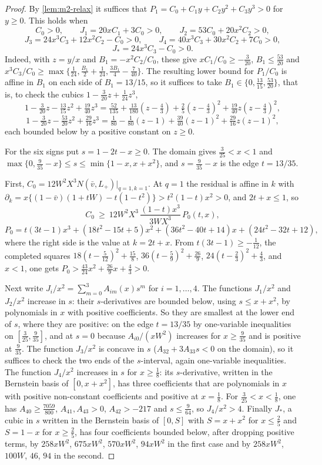 \begin{proof}
By \cref{lem:m2-relax} it suffices that $P_1=C_0+C_1y+C_2y^2+C_3y^3>0$ for $y\ge0$. This holds when
\[
C_0>0,\qquad J_1=20xC_1+3C_0>0,\qquad J_2=53C_0+20x^2C_2>0,
\]
\[
J_3=24x^3C_3+12x^2C_2-C_0>0,\qquad J_4=40x^3C_3+30x^2C_2+7C_0>0,
\]
\[
J_*=24x^3C_3-C_0>0.
\]
Indeed, with $z=y/x$ and $B_1=-x^2C_2/C_0$, these give $xC_1/C_0\ge-\frac3{20}$, $B_1\le\frac{53}{20}$
and $x^3C_3/C_0\ge\max\{\frac1{24},\frac{B_1}2+\frac1{24},\frac{3B_1}4-\frac7{40}\}$. The resulting lower
bound for $P_1/C_0$ is affine in $B_1$ on each side of $B_1=13/15$, so it suffices to take
$B_1\in\{0,\frac{13}{15},\frac{53}{20}\}$, that is, to check the cubics $1-\frac3{20}z+\frac1{24}z^3$,
\[
1-\tfrac3{20}z-\tfrac{13}{15}z^2+\tfrac{19}{40}z^3=\tfrac{52}{135}+\tfrac{13}{180}(z-\tfrac43)+\tfrac25(z-\tfrac43)^2+\tfrac{19}{40}z(z-\tfrac43)^2,
\]
\[
1-\tfrac3{20}z-\tfrac{53}{20}z^2+\tfrac{29}{16}z^3=\tfrac1{80}-\tfrac1{80}(z-1)+\tfrac{39}{40}(z-1)^2+\tfrac{29}{16}z(z-1)^2,
\]
each bounded below by a positive constant on $z\ge0$.

For the six signs put $s=1-2t-x\ge0$. The domain gives $\frac3{25}<x<1$ and
$\max\{0,\frac9{35}-x\}\le s\le\min\{1-x,x+x^2\}$, and $s=\frac9{35}-x$ is the edge $t=13/35$.

First, $C_0=12W^2X^3N(\bar v,L_+)|_{q=1,k=1}$. At $q=1$ the residual is affine in $k$ with
$\partial_k=x\{(1-\bar v)(1+tW)-t(1-t^2)\}>t^2(1-t)x^2>0$, and $2t+x\le1$, so
\[
C_0\ \ge\ 12W^2X^3\,\frac{(1-t)x^3}{3WX^3}\,P_0(t,x),
\]
\[
P_0=t(3t-1)x^3+(18t^2-15t+5)x^2+(36t^2-40t+14)x+(24t^2-32t+12),
\]
where the right side is the value at $k=2t+x$. From $t(3t-1)\ge-\frac1{12}$, the completed squares
$18(t-\frac5{12})^2+\frac{15}8$, $36(t-\frac59)^2+\frac{26}9$, $24(t-\frac23)^2+\frac43$, and $x<1$, one gets
$P_0>\frac{43}{24}x^2+\frac{26}9x+\frac43>0$.

Next write $J_i/x^2=\sum_{m=0}^3A_{im}(x)s^m$ for $i=1,\dots,4$. The functions $J_1/x^2$ and $J_2/x^2$
increase in $s$: their $s$-derivatives are bounded below, using $s\le x+x^2$, by polynomials in $x$
with positive coefficients. So they are smallest at the lower end of $s$, where they are positive:
on the edge $t=13/35$ by one-variable inequalities on $[\frac3{25},\frac9{35}]$, and at $s=0$ because
$A_{i0}/(xW^2)$ increases for $x\ge\frac9{35}$ and is positive at $\frac9{35}$. The function $J_3/x^2$ is
concave in $s$ ($A_{32}+3A_{33}s<0$ on the domain), so it suffices to check the two ends of the
$s$-interval, again one-variable inequalities. The function $J_4/x^2$ increases in $s$ for
$x\ge\frac18$: its $s$-derivative, written in the Bernstein basis of $[0,x+x^2]$, has three
coefficients that are polynomials in $x$ with positive non-constant coefficients and positive at
$x=\frac18$. For $\frac3{25}<x<\frac18$, one has $A_{40}\ge\frac{7059}{800}$, $A_{41},A_{43}>0$,
$A_{42}>-217$ and $s\le\frac9{64}$, so $J_4/x^2>4$. Finally $J_*$, a cubic in $s$ written in the
Bernstein basis of $[0,S]$ with $S=x+x^2$ for $x\le\frac25$ and $S=1-x$ for $x\ge\frac25$, has four
coefficients bounded below, after dropping positive terms, by $258xW^2$, $675xW^2$, $570xW^2$,
$94xW^2$ in the first case and by $258xW^2$, $100W$, $46$, $94$ in the second.
\end{proof}

